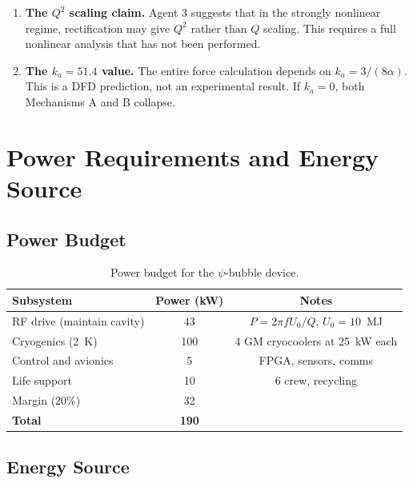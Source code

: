 \documentclass[12pt,aps,prd,superscriptaddress,nofootinbib,longbibliography]{revtex4-2}
\newcommand{\ka}{k_a}
\begin{document}
\begin{tcolorbox}[colback=yellow!5!white, colframe=yellow!50!black,
  title=Honesty Box: What Is Resolved and What Is Not]
\begin{enumerate}
\item \textbf{The $Q^2$ scaling claim.}
Agent 3 suggests that in the strongly nonlinear regime, rectification
may give $Q^2$ rather than $Q$ scaling.  This requires a full
nonlinear analysis that has not been performed.

\item \textbf{The $\ka = 51.4$ value.}
The entire force calculation depends on $\ka = 3/(8\alpha)$.  This is a
DFD prediction, not an experimental result.  If $\ka = 0$, both
Mechanisms A and B collapse.
\end{enumerate}
\end{tcolorbox}


\section{Power Requirements and Energy Source}\label{sec:power}

\subsection{Power Budget}

\begin{table}[h]
\caption{Power budget for the $\psi$-bubble device.}
\begin{ruledtabular}
\begin{tabular}{lcc}
Subsystem & Power (kW) & Notes \\
\hline
RF drive (maintain cavity) & 43 & $P = 2\pi f U_0/Q$, $U_0 = 10$~MJ \\
Cryogenics (2~K) & 100 & 4 GM cryocoolers at 25~kW each \\
Control and avionics & 5 & FPGA, sensors, comms \\
Life support & 10 & 6 crew, recycling \\
Margin (20\%) & 32 & \\
\hline
\textbf{Total} & \textbf{190} & \\
\end{tabular}
\end{ruledtabular}
\end{table}

\subsection{Energy Source}
\end{document}
